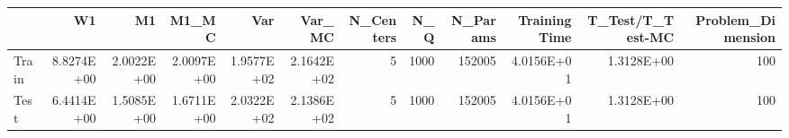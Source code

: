 \begin{tabular}{lrrrrrrrrrrr}
\toprule
{} &         W1 &         M1 &      M1\_MC &        Var &     Var\_MC &  N\_Centers &   N\_Q &  N\_Params &  Training Time &  T\_Test/T\_Test-MC &  Problem\_Dimension \\
\midrule
Train & 8.8274E+00 & 2.0022E+00 & 2.0097E+00 & 1.9577E+02 & 2.1642E+02 &          5 &  1000 &    152005 &     4.0156E+01 &        1.3128E+00 &                100 \\
Test  & 6.4414E+00 & 1.5085E+00 & 1.6711E+00 & 2.0322E+02 & 2.1386E+02 &          5 &  1000 &    152005 &     4.0156E+01 &        1.3128E+00 &                100 \\
\bottomrule
\end{tabular}
